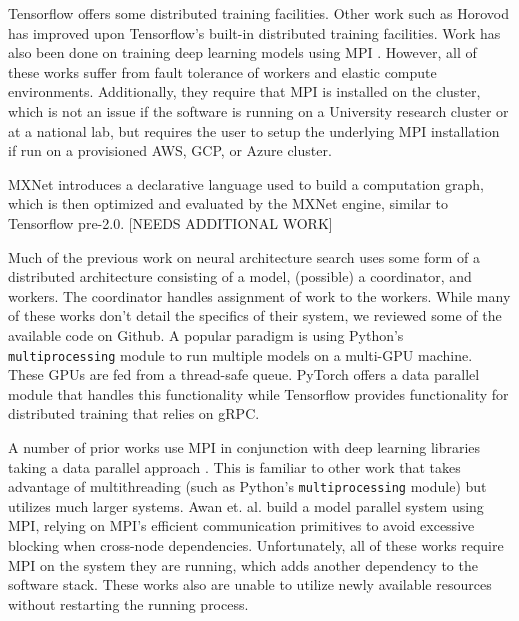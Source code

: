 \documentclass[conference]{IEEEtran}
\begin{document}
Tensorflow \cite{tensorflow2015-whitepaper} offers some distributed training
facilities. Other work such as Horovod \cite{DBLP:journals/corr/abs-1802-05799}
has improved upon Tensorflow's built-in distributed training facilities. Work
has also been done on training deep learning models using MPI
\cite{pmlr-v28-coates13, DBLP:journals/corr/VishnuSD16}. However, all of these
works suffer from fault tolerance of workers and elastic compute
environments. Additionally, they require that MPI is installed on the cluster,
which is not an issue if the software is running on a University research
cluster or at a national lab, but requires the user to setup the underlying MPI
installation if run on a provisioned AWS, GCP, or Azure cluster.

MXNet \cite{DBLP:journals/corr/ChenLLLWWXXZZ15} introduces a declarative language
used to build a computation graph, which is then optimized and evaluated by the
MXNet engine, similar to Tensorflow pre-2.0. [NEEDS ADDITIONAL WORK]

Much of the previous work on neural architecture search uses some form of a
distributed architecture consisting of a model, (possible) a coordinator, and workers. The
coordinator handles assignment of work to the workers. While many of these works
don't detail the specifics of their system, we reviewed some of the available
code on Github. A popular paradigm is using Python's \texttt{multiprocessing}
module to run multiple models on a multi-GPU machine. These GPUs are fed from a
thread-safe queue. PyTorch offers a data parallel module that handles this
functionality while Tensorflow provides functionality for distributed training
that relies on gRPC. 

A number of prior works use MPI in conjunction with deep learning libraries
taking a data parallel approach \cite{Awan:2016:ELM:2966884.2966912,
  Awan:2017:SCM:3018743.3018769}. This is familiar to other work that takes
advantage of multithreading (such as Python's \texttt{multiprocessing} module)
but utilizes much larger systems. Awan et. al.
\cite{Awan:2018:OBD:3236367.3236381} build a model parallel system using
MPI, relying on MPI's efficient communication primitives to avoid excessive
blocking when cross-node dependencies. Unfortunately, all of these works
require MPI on the system they are running, which adds another dependency
to the software stack. These works also are unable to utilize newly available
resources without restarting the running process.
\end{document}
